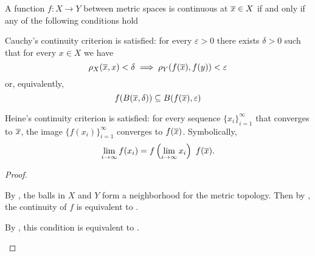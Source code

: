 \begin{theorem}\label{thm:metric_space_continuity}
  A function \( f: X \to Y \) between metric spaces is continuous at \( \overline{x} \in X \) if and only if any of the following conditions hold
  \begin{thmenum}
     Cauchy's continuity criterion is satisfied: for every \( \varepsilon > 0 \) there exists \( \delta > 0 \) such that for every \( x \in X \) we have
    \begin{equation}\label{thm:metric_space_continuity/inequality}
      \rho_X(\overline{x}, x) < \delta \implies \rho_Y(f(\overline{x}), f(y)) < \varepsilon
    \end{equation}
    or, equivalently,
    \begin{equation}\label{thm:metric_space_continuity/inclusion}
      f(B(\overline{x}, \delta)) \subseteq B(f(\overline{x}), \varepsilon)
    \end{equation}

     Heine's continuity criterion is satisfied: for every sequence \( \{ x_i \}_{i=1}^\infty \) that converges to \( \overline{x} \), the image \( \{ f(x_i) \}_{i=1}^\infty \) converges to \( f(\overline{x}) \). Symbolically,
    \begin{equation}\label{thm:metric_space_continuity/sequences/limit}
      \lim_{i \to \infty} f(x_i) = f\left(\lim_{i \to \infty} x_i \right) \ f(\overline{x}).
    \end{equation}
  \end{thmenum}
\end{theorem}
\begin{proof}\mbox{}
  \begin{description}
     By , the balls in \( X \) and \( Y \) form a neighborhood  for the metric topology. Then by , the continuity of \( f \) is equivalent to .

     By , this condition is equivalent to .
  \end{description}
\end{proof}

